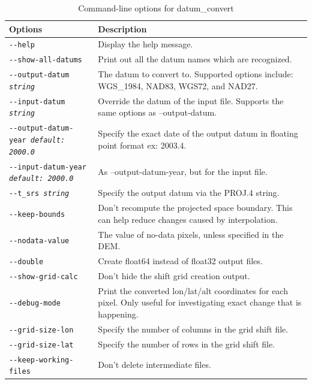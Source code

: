 \begin{longtable}{|l|p{10cm}|}
\caption{Command-line options for datum\_convert}
\label{tbl:datumconvert}
\endfirsthead
\endhead
\endfoot
\endlastfoot
\hline
Options & Description \\ \hline \hline
\texttt{-\/-help} & Display the help message.\\ \hline
\texttt{-\/-show-all-datums} & Print out all the datum names which are recognized.\\ \hline
\texttt{-\/-output-datum \textit{string}} & The datum to convert to. Supported options include: WGS\_1984, NAD83, WGS72, and NAD27. \\ \hline
\texttt{-\/-input-datum \textit{string}} & Override the datum of the input file.  Supports the same options as --output-datum. \\ \hline
\texttt{-\/-output-datum-year \textit{default: 2000.0}} & Specify the exact date of the output datum in floating point format ex: 2003.4.\\ \hline
\texttt{-\/-input-datum-year \textit{default: 2000.0}} & As --output-datum-year, but for the input file.\\ \hline
\texttt{-\/-t\_srs \textit{string}} & Specify the output datum via the PROJ.4 string. \\ \hline
\texttt{-\/-keep-bounds} & Don't recompute the projected space boundary.  This can 
help reduce changes caused by interpolation.\\ \hline
\texttt{-\/-nodata-value} & The value of no-data pixels, unless specified in the DEM.\\ \hline
\texttt{-\/-double} & Create float64 instead of float32 output files.\\ \hline
\texttt{-\/-show-grid-calc} & Don't hide the shift grid creation output.\\ \hline
\texttt{-\/-debug-mode} & Print the converted lon/lat/alt coordinates for each pixel.
Only useful for investigating exact change that is happening.\\ \hline
\texttt{-\/-grid-size-lon} & Specify the number of columns in the grid shift file.\\ \hline
\texttt{-\/-grid-size-lat} & Specify the number of rows in the grid shift file.\\ \hline
\texttt{-\/-keep-working-files} & Don't delete intermediate files.\\ \hline

\end{longtable}


